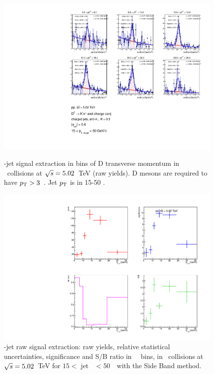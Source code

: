\begin{figure}[bth]
\centering
\begin{minipage}{.65\textwidth}
  \centering
  \includegraphics[width=\linewidth]{pp_2sig/R3_jetbin_15_50/invMass_pTD5}
\caption{\Dzero-jet signal extraction in bins of D transverse momentum in \pp\ collisions at $\sqrt{s}=5.02$~TeV (raw yields). D mesons are required to have $p_{\rm T}>3$~\GeVc. Jet $p_{\rm T}$ is in 15-50 \GeVc.
}
\label{fig:eq_pp_InvMass_Dzero_15_50_R3}
\end{minipage}%
\begin{minipage}{.4\textwidth}
  \centering
  \includegraphics[width=\linewidth]{pp_2sig/R3_jetbin_15_50/signalParams_pTD5}
\caption{%
\Dzero-jet raw signal extraction: raw yields, relative statistical uncertainties, significance and S/B ratio in \Dzero\ \pt\ bins, in \pp\ collisions at $\sqrt{s}=5.02$~TeV for $15<$ jet \pt\ $<50$~\GeVc\ with the Side Band method.
}
\label{fig:eq_pp_signalParams_15_50_R3}
\end{minipage}
\end{figure}
